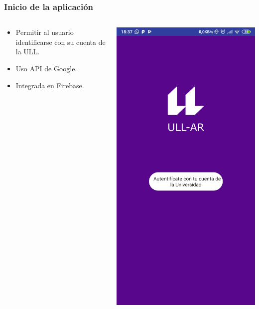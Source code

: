  

\begin{frame}
	\frametitle{Inicio de la aplicación}
	\begin{columns}
		\begin{column}{0.6\textwidth}
			\begin{itemize}
				\item Permitir al usuario identificarse con su cuenta de la ULL.
				\item Uso API de Google.
				\item Integrada en Firebase.
			\end{itemize}
			\endblock{}
		\end{column}
		\begin{column}{0.4\textwidth}
			\vfill 
			\begin{center}
				\includegraphics[width=0.7\linewidth]{Images/loginApp}
			\end{center}
		\end{column}
	\end{columns}
\end{frame}
  
